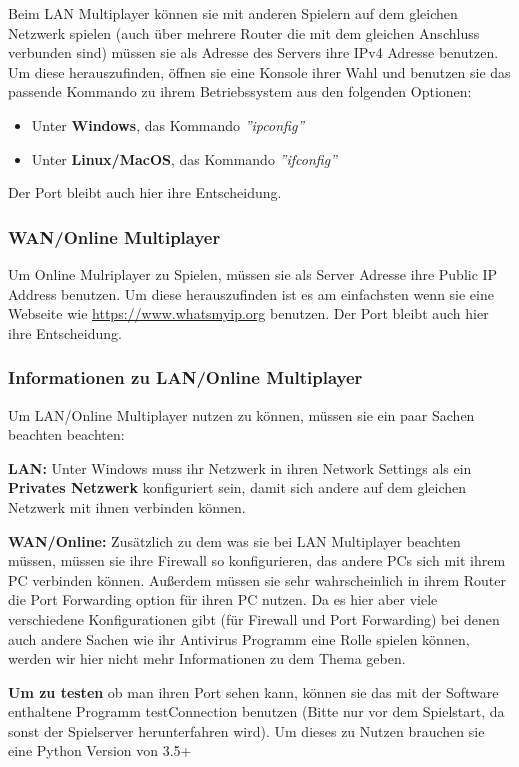 \documentclass[fontsize=12pt,paper=a4,twoside]{scrartcl}
\begin{document}
Beim LAN Multiplayer können sie mit anderen Spielern auf dem gleichen Netzwerk spielen (auch über mehrere Router die mit dem gleichen Anschluss verbunden sind) müssen sie als Adresse des Servers ihre IPv4 Adresse benutzen. Um diese herauszufinden, öffnen sie eine Konsole ihrer Wahl und benutzen sie das passende Kommando zu ihrem Betriebssystem aus den folgenden Optionen:

\begin{itemize}
\item Unter \textbf{Windows}, das Kommando \textit{''ipconfig''}
\item Unter \textbf{Linux/MacOS}, das Kommando \textit{''ifconfig''}
\end{itemize}

Der Port bleibt auch hier ihre Entscheidung.

\subsubsection{WAN/Online Multiplayer}

Um Online Mulriplayer zu Spielen, müssen sie als Server Adresse ihre Public IP Address benutzen. Um diese herauszufinden ist es am einfachsten wenn sie eine Webseite wie \url{https://www.whatsmyip.org} benutzen. Der Port bleibt auch hier ihre Entscheidung.

\subsubsection{Informationen zu LAN/Online Multiplayer}

Um LAN/Online Multiplayer nutzen zu können, müssen sie ein paar Sachen beachten beachten:

\textbf{LAN:} Unter Windows muss ihr Netzwerk in ihren Network Settings als ein \textbf{Privates Netzwerk} konfiguriert sein, damit sich andere auf dem gleichen Netzwerk mit ihnen verbinden können.

\textbf{WAN/Online:} Zusätzlich zu dem was sie bei LAN Multiplayer beachten müssen, müssen sie ihre Firewall so konfigurieren, das andere PCs sich mit ihrem PC verbinden können. Außerdem müssen sie sehr wahrscheinlich in ihrem Router die Port Forwarding option für ihren PC nutzen. Da es hier aber viele verschiedene Konfigurationen gibt (für Firewall und Port Forwarding) bei denen auch andere Sachen wie ihr Antivirus Programm eine Rolle spielen können, werden wir hier nicht mehr Informationen zu dem Thema geben.

\textbf{Um zu testen} ob man ihren Port sehen kann, können sie das mit der Software enthaltene Programm testConnection benutzen (Bitte nur vor dem Spielstart, da sonst der Spielserver herunterfahren wird). Um dieses zu Nutzen brauchen sie eine Python Version von 3.5+ 
\end{document}
